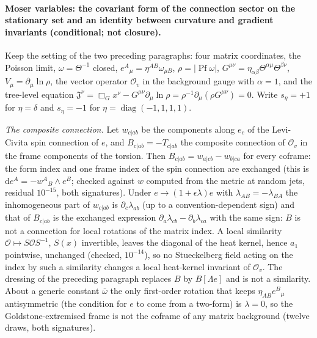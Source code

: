 
\paragraph{Moser variables: the covariant form of the connection sector on the stationary set and an identity between curvature and gradient invariants (conditional; not closure).}
Keep the setting of the two preceding paragraphs: four matrix coordinates, the Poisson limit, \(\omega=\Theta^{-1}\) closed, \(e^A{}_\mu=\eta^{AB}\omega_{\mu B}\), \(\rho=\lvert\operatorname{Pf}\omega\rvert\), \(G^{\mu\nu}=\eta_{\alpha\beta}\Theta^{\alpha\mu}\Theta^{\beta\nu}\), \(V_\mu=\partial_\mu\ln\rho\), the vector operator \(\mathcal O_v\) in the background gauge with \(\alpha=1\), and the tree-level equation \(\mathfrak J^\nu=\Box_Gx^\nu-G^{\mu\nu}\partial_\mu\ln\rho=\rho^{-1}\partial_\mu(\rho G^{\mu\nu})=0\). Write \(s_\eta=+1\) for \(\eta=\delta\) and \(s_\eta=-1\) for \(\eta=\operatorname{diag}(-1,1,1,1)\).

\emph{The composite connection.} Let \(w_{c|ab}\) be the components along \(e_c\) of the Levi-Civita spin connection of \(e\), and \(B_{c|ab}=-T_{c|ab}\) the composite connection of \(\mathcal O_v\) in the frame components of the torsion. Then \(B_{c|ab}=w_{a|cb}-w_{b|ca}\) for every coframe: the form index and one frame index of the spin connection are exchanged (this is \(\mathrm de^A=-w^A{}_B\wedge e^B\); checked against \(w\) computed from the metric at random jets, residual \(10^{-15}\), both signatures). Under \(e\to(1+\epsilon\lambda)e\) with \(\lambda_{AB}=-\lambda_{BA}\) the inhomogeneous part of \(w_{c|ab}\) is \(\partial_c\lambda_{ab}\) (up to a convention-dependent sign) and that of \(B_{c|ab}\) is the exchanged expression \(\partial_a\lambda_{cb}-\partial_b\lambda_{ca}\) with the same sign: \(B\) is not a connection for local rotations of the matrix index. A local similarity \(\mathcal O\mapsto S\mathcal OS^{-1}\), \(S(x)\) invertible, leaves the diagonal of the heat kernel, hence \(a_1\) pointwise, unchanged (checked, \(10^{-14}\)), so no Stueckelberg field acting on the index by such a similarity changes a local heat-kernel invariant of \(\mathcal O_v\). The dressing of the preceding paragraph replaces \(B\) by \(B[\Lambda e]\) and is not a similarity. About a generic constant \(\bar\omega\) the only first-order rotation that keeps \(\eta_{AB}e^B{}_\mu\) antisymmetric (the condition for \(e\) to come from a two-form) is \(\lambda=0\), so the Goldstone-extremised frame is not the coframe of any matrix background (twelve draws, both signatures).


